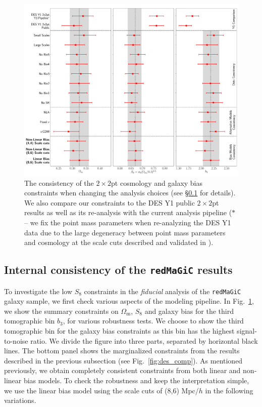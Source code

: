 \documentclass[aps, prd,twocolumn,superscriptaddress,nofootinbib,preprintnumbers]{revtex4-1}
\newcommand{\om}{\ensuremath{\Omega_{\mathrm m}}}
\newcommand{\redmagic}{\texttt{redMaGiC} }
\begin{document}
\begin{figure}
\includegraphics[width=\textwidth]{figs/2x2pt_consistency.pdf}
\caption[]{The consistency of the $2\times2$pt cosmology and galaxy bias constraints when changing the analysis choices (see \S\ref{sec:internal_consistency} for details). We also compare our constraints to the DES Y1 public $2\times2$pt results as well as its re-analysis with the current analysis pipeline ($*$ -- we fix the point mass parameters when re-analyzing the DES Y1 data due to the large degeneracy between point mass parameters and cosmology at the scale cuts described and validated in \citet{Abbott_2018}).}
\label{fig:2x2pt_consistency}
\end{figure}


\subsection{Internal consistency of the \redmagic results}
\label{sec:internal_consistency}

To investigate the low $S_8$ constraints in the \textit{fiducial} analysis of the \redmagic galaxy sample, we first check various aspects of the modeling pipeline. In Fig.~\ref{fig:2x2pt_consistency}, we show the summary constraints on $\om$, $S_8$ and galaxy bias for the third tomographic bin $b_3$, for various robustness tests. We choose to show the third tomographic bin for the galaxy bias constraints as this bin has the highest signal-to-noise ratio. We divide the figure into three parts, separated by horizontal black lines. The bottom panel shows the marginalized constraints from the results described in the previous subsection (see Fig.~\ref{fig:des_comp}). As mentioned previously, we obtain completely consistent constraints from both linear and non-linear bias models. To check the robustness and keep the interpretation simple, we use the linear bias model using the scale cuts of (8,6) Mpc/$h$ in the following variations.  
\end{document}
